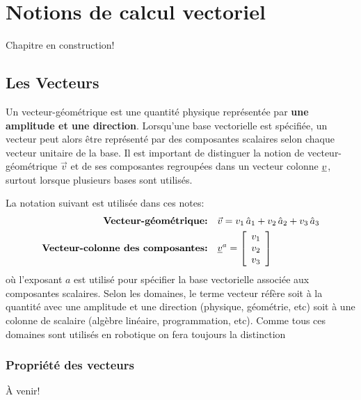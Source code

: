 \chapter{Notions de calcul vectoriel}
\label{sec:calcvec}

Chapitre en construction!

\section{Les Vecteurs}
\label{sec:vec}

Un vecteur-géométrique est une quantité physique représentée par \textbf{une amplitude et une direction}. Lorsqu'une base vectorielle est spécifiée, un vecteur peut alors être représenté par des composantes scalaires selon chaque vecteur unitaire de la base. Il est important de distinguer la notion de vecteur-géométrique $\vec{v}$ et de ses composantes regroupées dans un vecteur colonne $\underline{v}$, surtout lorsque plusieurs bases sont utilisés. 

La notation suivant est utilisée dans ces notes:
\begin{align}
\text{\textbf{Vecteur-géométrique:}}&\quad
\vec{v} = v_1 \, \hat{a}_{1} + v_2 \, \hat{a}_{2} + v_3 \, \hat{a}_{3}
\\
\text{\textbf{Vecteur-colonne des composantes:}}&\quad
\underline{v}^{a} = \left[ \begin{array}{c} v_1 \\ v_2 \\ v_3  \end{array} \right] 
\label{eq:veccoldef2}
\end{align} 
où l'exposant $a$ est utilisé pour spécifier la base vectorielle associée aux composantes scalaires. Selon les domaines, le terme vecteur réfère soit à la quantité avec une amplitude et une direction (physique, géométrie, etc) soit à une colonne de scalaire (algèbre linéaire, programmation, etc). Comme tous ces domaines sont utilisés en robotique on fera toujours la distinction 


\subsection{Propriété des vecteurs}

À venir!


\newpage
